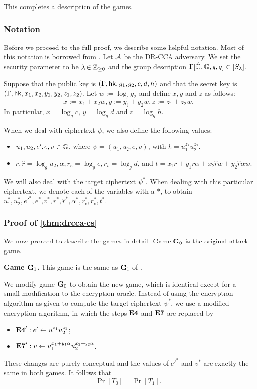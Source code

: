 This completes a description of the games. 

\subsubsection{Notation} Before we proceed to the full proof, we describe some helpful notation. Most of this notation is borrowed from \cite{cs01}. Let $\mathcal{A}$ be the DR-CCA adversary. We set the security parameter to be $\lambda\in\mathbb{Z}_{\geq 0}$ and the group description $\Gamma[\hat{\mathbb{G}},\mathbb{G},g,q]\in[S_\lambda]$.

Suppose that the public key is $(\Gamma,\mathsf{hk},g_1, g_2, c,d,h)$ and that the secret key is $(\Gamma,\mathsf{hk},x_1,x_2,y_1,y_2,z_1,z_2)$. Let $w:=\log_{g}g_2$ and define $x,y$ and $z$ as follows: $$x:=x_1+x_2w, y:= y_1+y_2w, z:= z_1+z_2w.$$ In particular, $x=\log_{g}c$, $y=\log_gd$ and $z=\log_g h$.

When we deal with ciphertext $\psi$, we also define the following values:
\begin{itemize}
	\item $u_1,u_2,e',e,v\in\mathbb{G}$, where $\psi = (u_1,u_2,e,v)$, with $h = u_1^{z_1}u_2^{z_2}$.
	\item $r,\hat{r} = \log_gu_2, \alpha, r_e = \log_ge, r_v = \log_g d$, and $t = x_1r + y_1r\alpha + x_2\hat{r}w + y_2\hat{r}\alpha w$.
\end{itemize}

We will also deal with the target ciphertext $\psi^{*}$. When dealing with this particular ciphertext, we denote each of the variables with a $*$, to obtain $u_1^{*}, u_2^{*}, {e'}^{*}, e^{*}, v^{*}, r^{*},\hat{r}^{*}, \alpha^{*}, r_e^{*}, r_v^{*}, t^{*}.$

\subsubsection{Proof of \cref{thm:drcca-cs}}

We now proceed to describe the games in detail. Game $\mathbf{G}_0$ is the original attack game.

\textbf{Game $\mathbf{G}_1$.} This game is the same as $\mathbf{G}_1$ of \cite{cs01}. 

We modify game $\mathbf{G}_0$ to obtain the new game, which is identical except for a small modification to the encryption oracle. Instead of using the encryption algorithm as given to compute the target ciphertext $\psi^{*}$, we use a modified encryption algorithm, in which the steps $\mathbf{E4}$ and $\mathbf{E7}$ are replaced by 
\begin{itemize}
	\item[] $\mathbf{E4}': e'\gets u_1^{z_1}u_2^{z_1}$;
	\item[] $\mathbf{E7}': v\gets u_1^{x_1+y_1\alpha}u_2^{x_2+y_2\alpha}$.
\end{itemize}
These changes are purely conceptual and the values of $e'^{*}$ and $v^{*}$ are exactly the same in both games. It follows that $$\Pr[T_0]=\Pr[T_1].$$

